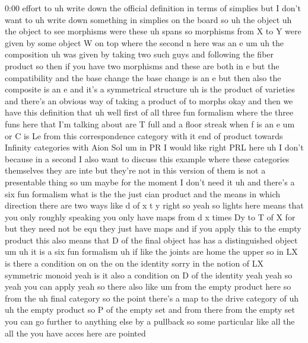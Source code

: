 \begin{unfinished}{0:00}
effort  to  uh  write  down  the  official
definition  in  terms  of  simplies  but  I
don't  want  to  uh  write  down  something  in
simplies  on  the  board  so
uh  the  object  uh  the  object  to
see  morphisms  were  these  uh  spans  so
morphisms  from  X  to  Y  were  given  by  some
object  W  on  top  where  the  second  n  here
was  an
e
um  uh  the
composition  uh  was  given  by  taking  two
such
guys  and  following  the  fiber
product  so  then  if  you  have  two
morphisms  and  these  are  both  in  e  but
the  compatibility  and  the  base  change
the  base  change  is  an  e  but  then  also
the  composite  is  an  e
and  it's  a  symmetrical
structure
uh  is  the  product  of  varieties
and  there's  an  obvious  way  of  taking  a
product  of  to
morphs
okay
and  then  we  have  this  definition  that
uh  well  first  of  all  three  fun
formalism  where  the  three  funs  here  that
I'm  talking  about  are  T  full  and  a  floor
streak  when  f  is  an
e
um  or
C
is  Le
from  this  correspondence
category  with  it  end  of
product
towards  Infinity  categories  with  Aion
Sol  um  in  PR  I  would  like  right  PRL  here
uh  I  don't  because  in  a  second  I  also
want  to  discuss  this  example  where  these
categories  themselves  they  are  inte  but
they're
not  in  this  version  of  them  is  not  a
presentable  thing  so
um  maybe  for  the  moment  I  don't  need  it
uh  and  there's  a  six  fun
formalism  what  is  the
the  just  cian
product  and  the  means  in  which  direction
there  are  two  ways  like  d  of  x  t
y  right  so  yeah  so  lights  here  means
that  you  only  roughly  speaking  you  only
have  maps  from
d  x  times
Dy  to  T  of  X
for  but  they  need  not  be  equ  they  just
have
maps  and  if  you  apply  this  to  the  empty
product  this  also  means  that
D  of  the  final  object
has  has  a  distinguished  object
um  uh  it  is  a  six  fun  formalism  uh
if  like  the  joints  are
home  the
upper  so  in  LX  is  there  a  condition  on
on  the  on  the
identity
sorry  in  the  notion  of  LX  symmetric
monoid  yeah  is  it  also  a  condition  on  D
of  the
identity  yeah  yeah  so  yeah  you  can  apply
yeah  so  there  also
like  um  from  the  empty  product  here  so
from
the  uh  final  category  so  the  point
there's  a  map  to  the  drive  category  of
uh  uh  the  empty  product  so  P  of  the
empty
set  and  from  there  from  the  empty  set
you  can  go  further  to  anything  else  by  a
pullback  so  some  particular  like  all  the
all  the  you  have  acces  here  are  pointed

\end{unfinished}
